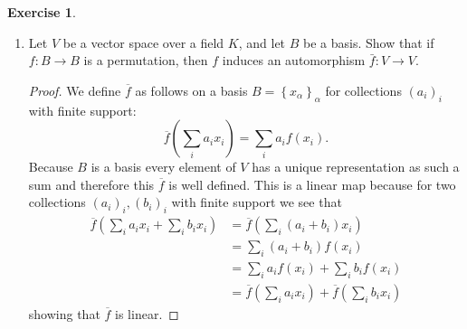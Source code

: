 \documentclass{article}
\newcommand{\set}[1]{\left\{#1\right\}}
\theoremstyle{definition}
\newtheorem{question}{Exercise}
\begin{document}
\begin{question}
\begin{enumerate}[(1)]
\begin{proof}
                  This shows chains have upper bounds so there is a maximal set
                  of linearly independent elements. Let
                  \(B=\set{x_{\beta}}_{\beta}\) be such a set and suppose it
                  does not span \(M\). Take \(m\in M\) disjoint from the span of
                  \(B\). Then \(m\) is linearly independent from \(B\): if not
                  then \(am+\sum_{\beta}a_{\beta}x_{\beta}=0\) for some
                  \(a,a_{\beta}\in K\). This means that
                  \(m=\sum_{\beta}a^{-1}a_{\beta}x_{\beta}\) so \(m\) was in the
                  span of \(B\). This means that \(B\cup\set{m}\) is linearly
                  independent: a contradiction with the fact that \(B\) was
                  maximal. This means that \(m\) is in the span of \(B\) so
                  \(B\) is a basis.
              \end{proof}

        \item Let \(V\) be a vector space over a field \(K\), and let \(B\) be a
              basis. Show that if \(f:B\to B\) is a permutation, then \(f\)
              induces an automorphism \(\bar{f}:V\to V\).

              \begin{proof}
                  We define \(\overline{f}\) as follows on a basis
                  \(B=\set{x_{\alpha}}_{\alpha}\) for collections
                  \((a_{i})_{i}\) with finite support:
                  \[
                      \overline{f}\left(\sum_{i}a_{i}x_{i}\right)=\sum_{i}a_{i}f(x_{i}).
                  \]
                  Because \(B\) is a basis every element of \(V\) has a unique
                  representation as such a sum and therefore this
                  \(\overline{f}\) is well defined. This is a linear map because
                  for two collections \((a_{i})_{i},(b_{i})_{i}\) with finite
                  support we see that
                  \begin{align*}
                      \overline{f}\left(\sum_{i}a_{i}x_{i}+\sum_{i}b_{i}x_{i}\right) & =\overline{f}\left(\sum_{i}(a_{i}+b_{i})x_{i}\right)                                     \\
                                                                                     & =\sum_{i}(a_{i}+b_{i})f(x_{i})                                                           \\
                                                                                     & =\sum_{i}a_{i}f(x_{i})+\sum_{i}b_{i}f(x_{i})                                             \\
                                                                                     & =\overline{f}\left(\sum_{i}a_{i}x_{i}\right)+\overline{f}\left(\sum_{i}b_{i}x_{i}\right)
                  \end{align*}
                  showing that \(\overline{f}\) is linear.


\end{proof}
\end{enumerate}
\end{question}
\end{document}
